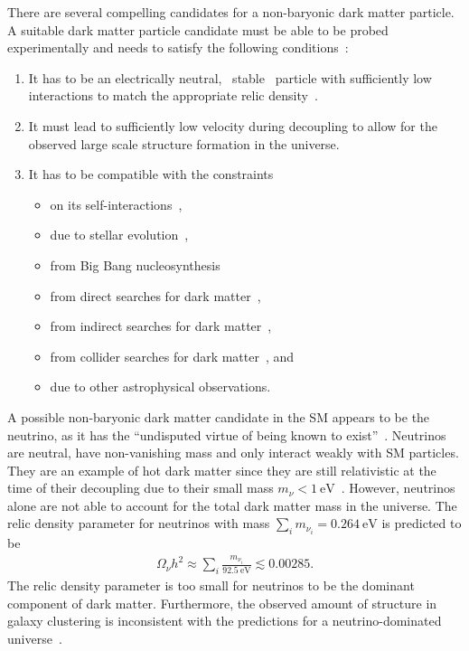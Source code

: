 There are several compelling candidates for a non-baryonic dark matter particle. A suitable dark matter particle candidate must be able to be probed experimentally and needs to satisfy the following conditions~\cite{Taoso2008}:
\begin{enumerate}
    \item It has to be an electrically neutral,~\cite{McDermott2011} stable~\cite{Audren2014} particle with sufficiently low interactions to match the appropriate relic density~\cite{Srednicki1988}.
    \item It must lead to sufficiently low velocity during decoupling to allow for the observed large scale structure formation in the universe.
    \item It has to be compatible with the constraints
    \begin{itemize}
        \item on its self-interactions~\cite{Randall2008,Tulin2018},
        \item due to stellar evolution~\cite{Scott2009},
        \item from Big Bang nucleosynthesis~\cite{Kawasaki2015}
        \item from direct searches for dark matter~\cite{Liu2017},
        \item from indirect searches for dark matter~\cite{Conrad2017},
        \item from collider searches for dark matter~\cite{Buchmueller2017}, and
        \item due to other astrophysical observations.
    \end{itemize}
\end{enumerate}

A possible non-baryonic dark matter candidate in the SM appears to be the neutrino, as it has the ``undisputed virtue of being known to exist''~\cite{Bergstroem2000}. Neutrinos are neutral, have non-vanishing mass and only interact weakly with SM particles. They are an example of hot dark matter since they are still relativistic at the time of their decoupling due to their small mass \(m_{\nu} < \SI{1}{\electronvolt}\)~\cite{Aker2019}. However, neutrinos alone are not able to account for the total dark matter mass in the universe. The relic density parameter for neutrinos with mass \(\sum_{i} m_{\nu_{i}} = \SI{0.264}{\electronvolt}\) is predicted to be~\cite{Loureiro2019}
\begin{align}
    \Omega_{\nu} h^2 \approx \sum_{i} \frac{m_{\nu_{i}}}{\SI{92.5}{\electronvolt}} \lesssim 0.00285.
\end{align}
The relic density parameter is too small for neutrinos to be the dominant component of dark matter. Furthermore, the observed amount of structure in galaxy clustering is inconsistent with the predictions for a neutrino-dominated universe~\cite{White1984}.

